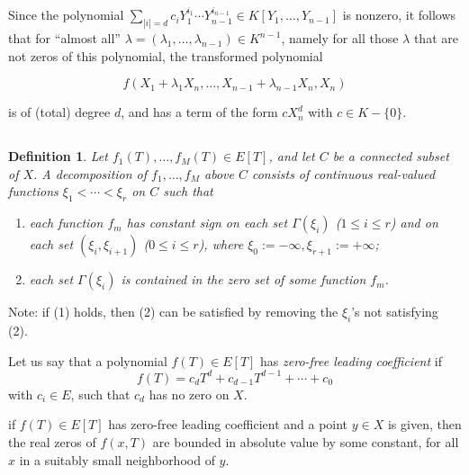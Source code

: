 \documentclass[12pt]{article}
\theoremstyle{mythm}
\newtheorem{definition}{Definition}[section]
\begin{document}
Since the polynomial \(\sum_{|i|=d} c_i Y_1^{i_1} \cdots Y_{n-1}^{i_{n-1}} \in K[Y_1, \ldots, Y_{n-1}]\) is nonzero, it follows that for ``almost all'' \(\lambda = (\lambda_1, \ldots, \lambda_{n-1}) \in K^{n-1}\), namely for all those \(\lambda\) that are not zeros of this polynomial, the transformed polynomial

\[
f(X_1 + \lambda_1 X_n, \ldots, X_{n-1} + \lambda_{n-1} X_n, X_n)
\]

is of (total) degree \(d\), and has a term of the form \(cX_n^d\) with \(c \in K - \{0\}\).
\subsection{}
\begin{definition}

Let \( f_1(T), \ldots, f_M(T) \in E[T] \), and let \( C \) be a connected subset of \( X \). A \emph{decomposition of \( f_1, \ldots, f_M \) above \( C \)} consists of continuous real-valued functions \( \xi_1 < \cdots < \xi_r \) on \( C \) such that

\begin{enumerate}
    \item each function \( f_m \) has constant sign on each set \( \Gamma(\xi_i) \) (\( 1 \leq i \leq r \)) and on each set \( (\xi_i, \xi_{i+1}) \) (\( 0 \leq i \leq r \)), where \( \xi_0 := -\infty, \xi_{r+1} := +\infty \);
    
    \item each set \( \Gamma(\xi_i) \) is contained in the zero set of some function \( f_m \).
\end{enumerate}
    
\end{definition}


Note: if (1) holds, then (2) can be satisfied by removing the $\xi_i$'s not satisfying (2).  

Let us say that a polynomial $f(T) \in E[T]$ has \emph{zero-free leading coefficient} if  
\[
f(T) = c_d T^d + c_{d-1} T^{d-1} + \cdots + c_0
\]  
with $c_i \in E$, such that $c_d$ has no zero on $X$.

if $f(T) \in E[T]$ has zero-free leading coefficient and a point $y \in X$ is given, then the real zeros of $f(x, T)$ are bounded in absolute value by some constant, for all $x$ in a suitably small neighborhood of $y$.
\end{document}
